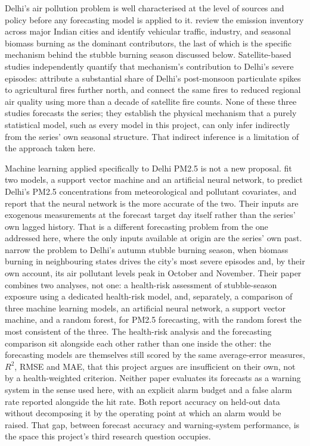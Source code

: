 \documentclass[12pt,a4paper]{report}
\begin{document}
Delhi's air pollution problem is well characterised at the level of sources
and policy before any forecasting model is applied to it.
\citet{guttikunda2014nature} review the emission inventory across major
Indian cities and identify vehicular traffic, industry, and seasonal biomass
burning as the dominant contributors, the last of which is the specific
mechanism behind the stubble burning season discussed below. Satellite-based
studies independently quantify that mechanism's contribution to Delhi's
severe episodes: \citet{cusworth2018quantifying} attribute a substantial
share of Delhi's post-monsoon particulate spikes to agricultural fires
further north, and \citet{jethva2019connecting} connect the same fires to
reduced regional air quality using more than a decade of satellite fire
counts. None of these three studies forecasts the series; they establish the
physical mechanism that a purely statistical model, such as every model in
this project, can only infer indirectly from the series' own seasonal
structure. That indirect inference is a limitation of the approach taken
here.

Machine learning applied specifically to Delhi PM2.5 is not a new proposal.
\citet{masood2020delhi} fit two models, a support vector machine and an
artificial neural network, to predict Delhi's PM2.5 concentrations from
meteorological and pollutant covariates, and report that the neural network
is the more accurate of the two. Their inputs are exogenous measurements at
the forecast target day itself rather than the series' own lagged history.
That is a different forecasting problem from the one addressed here, where
the only inputs available at origin are the series' own past.
\citet{singh2025stubble} narrow the problem to Delhi's autumn stubble
burning season, when biomass burning in neighbouring states drives the
city's most severe episodes and, by their own account, its air pollutant
levels peak in October and November. Their paper combines two analyses, not
one: a health-risk assessment of stubble-season exposure using a dedicated
health-risk model, and, separately, a comparison of three machine learning
models, an artificial neural network, a support vector machine, and a random
forest, for PM2.5 forecasting, with the random forest the most consistent of
the three. The health-risk analysis and the forecasting comparison sit
alongside each other rather than one inside the other: the forecasting
models are themselves still scored by the same average-error measures,
$R^2$, RMSE and MAE, that this project argues are insufficient on their own,
not by a health-weighted criterion. Neither paper evaluates its forecasts as
a warning system in the sense used here, with an explicit alarm budget and a
false alarm rate reported alongside the hit rate. Both report accuracy on
held-out data without decomposing it by the operating point at which an
alarm would be raised. That gap, between forecast accuracy and warning-system performance, is the space this project's third research question
occupies.
\end{document}
